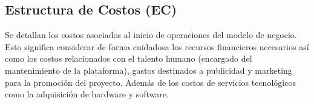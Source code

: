 {}
\subsection*{Estructura de Costos (EC)}

Se detallan los costos asociados al inicio de operaciones del modelo de negocio. Esto significa considerar de forma cuidadosa los recursos financieros necesarios así como los costos relacionados con el talento humano (encargado del mantenimiento de la plataforma), gastos destinados a publicidad y marketing para la promoción del proyecto. Además de los costos de servicios tecnológicos como la adquisición de hardware y software.